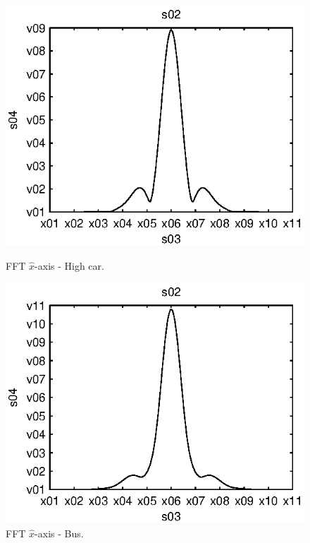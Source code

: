 \begin{subfigures}
\begin{figure}[tfhb]
\begin{minipage}{0.45\linewidth}
 	\centering
 	
	\includegraphics[width=1\linewidth]{images/fft-high_car-x}
  	\caption[FFT $\hat{x}$-axis - High car]{FFT $\hat{x}$-axis - High car.}
  	\label{fig:fft-high_car-x} 
 \end{minipage} \hfill
 \begin{minipage}{0.45\linewidth}
 \centering
 	
	\includegraphics[width=1\linewidth]{images/fft-bus-x}
  	\caption[FFT $\hat{x}$-axis - Bus]{FFT $\hat{x}$-axis - Bus.}
  	\label{fig:fft-bus-x} 
 \end{minipage}
\end{figure}
\end{subfigures}

